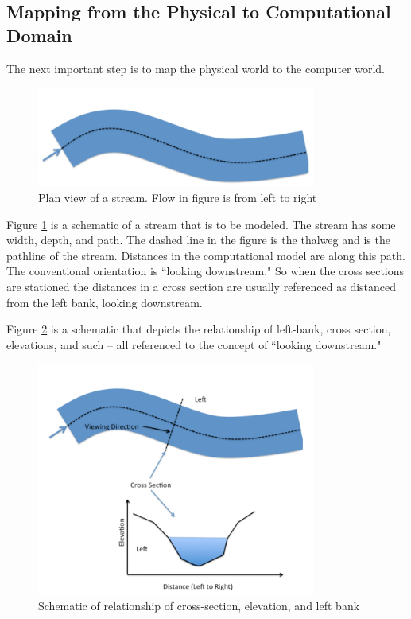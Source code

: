 \subsection{Mapping from the Physical to Computational Domain}
The next important step is to map the physical world to the computer world.

\begin{figure}[h!] %
   \centering
   \includegraphics[width=3.6in]{stream-schematic.jpg} 
   \caption{Plan view of a stream.  Flow in figure is from left to right}
   \label{fig:stream-schematic}
\end{figure}

Figure \ref{fig:stream-schematic} is a schematic of a stream that is to be modeled. 
The stream has some width, depth, and path. 
The dashed line in the figure is the thalweg and is the pathline of the stream. 
Distances in the computational model are along this path. 
The conventional orientation is ``looking downstream." 
So when the cross sections are stationed the distances in a cross section are usually referenced as distanced from the left bank, looking downstream.

Figure \ref{fig:stream-section-schematic} is a schematic that depicts the relationship of left-bank, cross section, elevations, and such -- all referenced to the concept of ``looking downstream."

\begin{figure}[h!] %
   \centering
   \includegraphics[width=3.6in]{stream-section-schematic.jpg} 
   \caption{Schematic of relationship of cross-section, elevation, and left bank}
   \label{fig:stream-section-schematic}
\end{figure}
\newpage

